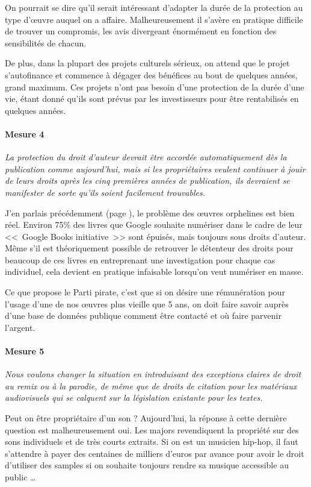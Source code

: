 On pourrait se dire qu'il serait intéressant d'adapter la durée de la protection au type d'œuvre auquel on a affaire.
Malheureusement il s'avère en pratique difficile de trouver un compromis, les avis divergeant énormément en fonction des sensibilités de chacun.

De plus, dans la plupart des projets culturels sérieux, on attend que le projet s'autofinance et commence à dégager des bénéfices au bout de quelques années, grand maximum.
Ces projets n'ont pas besoin d'une protection de la durée d'une vie, étant donné qu'ils sont prévus par les investisseurs pour être rentabilisés en quelques années.

\paragraph{Mesure 4}
\textit{La protection du droit d'auteur devrait être accordée automatiquement dès la publication comme aujourd'hui, mais si les propriétaires veulent continuer à jouir de leurs droits après les cinq premières années de publication, ils devraient se manifester de sorte qu'ils soient facilement trouvables.}

J'en parlais précédemment (page \pageref{oeuvres-orphelines}), le problème des œuvres orphelines est bien réel.
Environ 75\% des livres que Google souhaite numériser dans le cadre de leur <<~Google Books initiative~>> sont épuisés, mais toujours sous droits d'auteur.
Même s'il est théoriquement possible de retrouver le détenteur des droits pour beaucoup de ces livres en entreprenant une investigation pour chaque cas individuel, cela devient en pratique infaisable lorsqu'on veut numériser en masse.

Ce que propose le Parti pirate, c'est que si on désire une rémunération pour l'usage d'une de nos œuvres plus vieille que 5 ans, on doit faire savoir auprès d'une base de données publique comment être contacté et où faire parvenir l'argent.

\paragraph{Mesure 5}
\textit{Nous voulons changer la situation en introduisant des exceptions claires de droit au remix ou à la parodie, de même que de droits de citation pour les matériaux audiovisuels qui se calquent sur la législation existante pour les textes.}

Peut on être propriétaire d'un son ? 
Aujourd'hui, la réponse à cette dernière question est malheureusement oui.
Les majors revendiquent la propriété sur des sons individuels et de très courts extraits.
Si on est un musicien hip-hop, il faut s'attendre à payer des centaines de milliers d'euros par avance pour avoir le droit d'utiliser des samples si on souhaite toujours rendre sa musique accessible au public \dots{}

